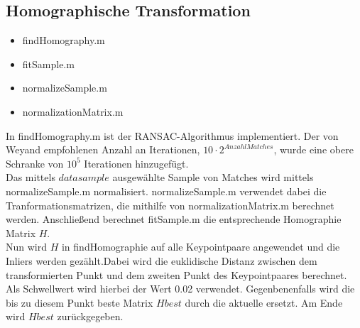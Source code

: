 \documentclass[deutsch]{scrartcl}
\begin{document}
\subsection{Homographische Transformation}
\begin{itemize}
	\item findHomography.m 
	\item fitSample.m 
	\item normalizeSample.m
	\item normalizationMatrix.m
\end{itemize}
In findHomography.m ist der RANSAC-Algorithmus implementiert. Der von Weyand\cite{pandemo} empfohlenen Anzahl an Iterationen, $10 \cdot 2^{AnzahlMatches}$, wurde eine obere Schranke von $10^5$ Iterationen hinzugefügt.\\
Das mittels $datasample$ ausgewählte Sample von Matches wird mittels normalizeSample.m normalisiert. normalizeSample.m verwendet dabei die Tranformationsmatrizen, die mithilfe von normalizationMatrix.m berechnet werden. Anschließend berechnet fitSample.m die entsprechende Homographie Matrix $H$. \\
Nun wird $H$ in findHomographie auf alle Keypointpaare angewendet und die Inliers werden gezählt.Dabei wird die euklidische Distanz zwischen dem transformierten Punkt und dem zweiten Punkt des Keypointpaares berechnet. Als Schwellwert wird hierbei der Wert 0.02 verwendet. Gegenbenenfalls wird die bis zu diesem Punkt beste Matrix $Hbest$ durch die aktuelle ersetzt. Am Ende wird $Hbest$ zurückgegeben.
\end{document}
